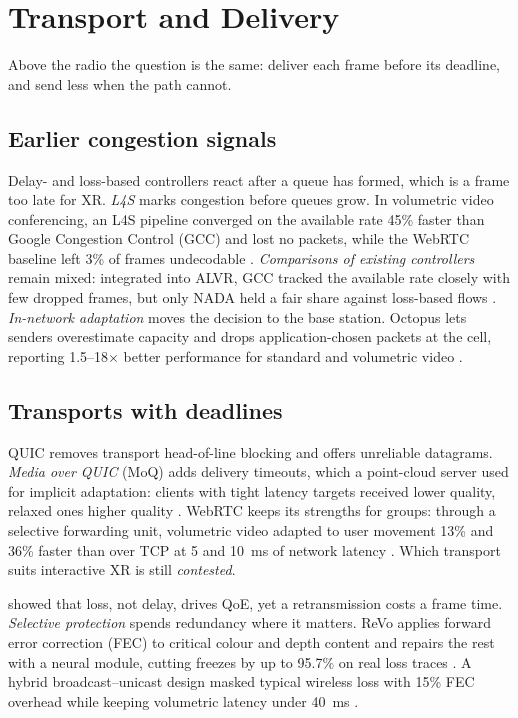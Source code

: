 \section{Transport and Delivery}\label{sec:transport}

Above the radio the question is the same: deliver each frame before its deadline, and send less when the
path cannot.

\subsection{Earlier congestion signals}
Delay- and loss-based controllers react after a queue has formed, which is a frame too late for XR.
\emph{L4S} marks congestion before queues grow. In volumetric video conferencing, an L4S pipeline
converged on the available rate 45\% faster than Google Congestion Control (GCC) and lost no packets,
while the WebRTC baseline left 3\% of frames undecodable \cite{W4408870658}. \emph{Comparisons of
existing controllers} remain mixed: integrated into ALVR, GCC tracked the available rate closely with few
dropped frames, but only NADA held a fair share against loss-based flows \cite{W4415538381}.
\emph{In-network adaptation} moves the decision to the base station. Octopus lets senders overestimate
capacity and drops application-chosen packets at the cell, reporting 1.5--18$\times$ better performance
for standard and volumetric video \cite{W4401386494}.

\subsection{Transports with deadlines}
QUIC removes transport head-of-line blocking and offers unreliable datagrams. \emph{Media over QUIC} (MoQ)
adds delivery timeouts, which a point-cloud server used for implicit adaptation: clients with tight
latency targets received lower quality, relaxed ones higher quality \cite{W4417496773}. WebRTC keeps its
strengths for groups: through a selective forwarding unit, volumetric video adapted to user movement 13\%
and 36\% faster than over TCP at 5 and 10~ms of network latency \cite{W7151958829}. Which transport suits
interactive XR is still \emph{contested}.

 showed that loss, not delay, drives QoE, yet a retransmission costs a frame time.
\emph{Selective protection} spends redundancy where it matters. ReVo applies forward error correction (FEC)
to critical colour and depth content and repairs the rest with a neural module, cutting freezes by up to
95.7\% on real loss traces \cite{W7159678172}. A hybrid broadcast--unicast design masked typical wireless
loss with 15\% FEC overhead while keeping volumetric latency under 40~ms \cite{W4415933998}.

